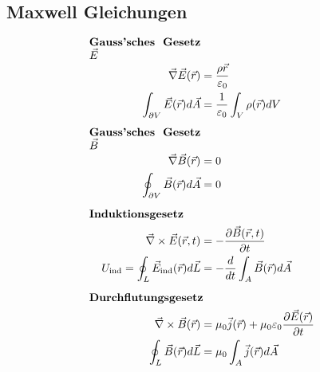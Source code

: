 \subsection{Maxwell Gleichungen}
    \begin{align*}
        \parbox{3.5cm}{\textbf{Gauss'sches Gesetz $\vec{E}$}}\\
        \vec{\nabla}\vec{E}(\vec{r}) &= \frac{\rho{\vec{r}}}{\varepsilon_0}\\
        \int_{\partial V} \vec{E}(\vec{r}) d \vec{A} &= \frac{1}{\varepsilon_0} \int_V \rho(\vec{r}) dV
        \\[0.5em]
        \parbox{3.5cm}{\textbf{Gauss'sches Gesetz $\vec{B}$}}\\
        \vec{\nabla}\vec{B}(\vec{r}) &= 0\\
        \oint_{\partial V} \vec{B}(\vec{r}) d \vec{A} &= 0
        \\[0.5em]
        \parbox{3.5cm}{\textbf{Induktionsgesetz}}\\
        \vec{\nabla} \times \vec{E}(\vec{r},t) &= - \frac{\partial \vec{B}(\vec{r},t)}{\partial t}\\
        U_\text{ind} = \oint_L \vec{E}_\text{ind}(\vec{r}) d \vec{L} &= - \frac{d}{dt} \int_A \vec{B}(\vec{r}) d \vec{A}
        \\[0.5em]
        \parbox{3.5cm}{\textbf{Durchflutungsgesetz}}\\
        \vec{\nabla} \times \vec{B}(\vec{r}) &= \mu_0 \vec{j}(\vec{r}) + \mu_0 \varepsilon_0 \frac{\partial \vec{E}(\vec{r})}{\partial t}\\
        \oint_L \vec{B}(\vec{r}) d \vec{L} &= \mu_0 \int_A \vec{j}(\vec{r}) d \vec{A}
    \end{align*}